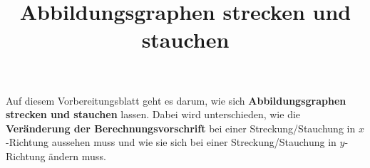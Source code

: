 \documentclass[]{uebungsblatt}
\title{Abbildungsgraphen strecken und stauchen}
\begin{document}
\maketitle
\begin{contents}
    Auf diesem Vorbereitungsblatt geht es darum, wie sich \textbf{Abbildungsgraphen strecken und stauchen} lassen. Dabei wird unterschieden, wie die \textbf{Veränderung der Berechnungsvorschrift} bei einer Streckung/Stauchung in $x$-Richtung aussehen muss und wie sie sich bei einer Streckung/Stauchung in $y$-Richtung ändern muss.
\end{contents}

\end{document}
